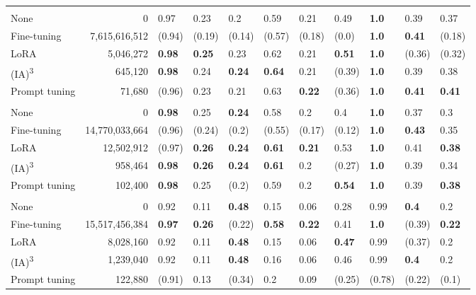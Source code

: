 \documentclass[12pt]{book}
\begin{document}
\begin{ThreePartTable}
\begin{xltabular}{\textwidth}{lr!{\color{white}\hspace{.5em}}YYYYYY!{\color{white}\hspace{1em}}YYY}
         \bigstrut \\*
        None & 0 & 0.97 & 0.23 & 0.2 & 0.59 & 0.21 & 0.49 & \textbf{1.0} & 0.39 & 0.37 \\*
        Fine-tuning & 7,615,616,512 & (0.94) & (0.19) & (0.14) & (0.57) & (0.18) & (0.0) & \textbf{1.0} & \textbf{0.41} & (0.18) \\*
        LoRA & 5,046,272 & \textbf{0.98} & \textbf{0.25} & 0.23 & 0.62 & 0.21 & \textbf{0.51} & \textbf{1.0} & (0.36) & (0.32) \\*
        (IA)\textsuperscript{3} & 645,120 & \textbf{0.98} & 0.24 & \textbf{0.24} & \textbf{0.64} & 0.21 & (0.39) & \textbf{1.0} & 0.39 & 0.38 \\*
        Prompt tuning & 71,680 & (0.96) & 0.23 & 0.21 & 0.63 & \textbf{0.22} & (0.36) & \textbf{1.0} & \textbf{0.41} & \textbf{0.41} \\

         \bigstrut \\*
        None & 0 & \textbf{0.98} & 0.25 & \textbf{0.24} & 0.58 & 0.2 & 0.4 & \textbf{1.0} & 0.37 & 0.3 \\*
        Fine-tuning & 14,770,033,664 & (0.96) & (0.24) & (0.2) & (0.55) & (0.17) & (0.12) & \textbf{1.0} & \textbf{0.43} & 0.35 \\*
        LoRA & 12,502,912 & (0.97) & \textbf{0.26} & \textbf{0.24} & \textbf{0.61} & \textbf{0.21} & 0.53 & \textbf{1.0} & 0.41 & \textbf{0.38} \\*
        (IA)\textsuperscript{3} & 958,464 & \textbf{0.98} & \textbf{0.26} & \textbf{0.24} & \textbf{0.61} & 0.2 & (0.27) & \textbf{1.0} & 0.39 & 0.34 \\*
        Prompt tuning & 102,400 & \textbf{0.98} & 0.25 & (0.2) & 0.59 & 0.2 & \textbf{0.54} & \textbf{1.0} & 0.39 & \textbf{0.38} \\

         \bigstrut \\*
        None & 0 & 0.92 & 0.11 & \textbf{0.48} & 0.15 & 0.06 & 0.28 & 0.99 & \textbf{0.4} & 0.2 \\*
        Fine-tuning & 15,517,456,384 & \textbf{0.97} & \textbf{0.26} & (0.22) & \textbf{0.58} & \textbf{0.22} & 0.41 & \textbf{1.0} & (0.39) & \textbf{0.22} \\*
        LoRA & 8,028,160 & 0.92 & 0.11 & \textbf{0.48} & 0.15 & 0.06 & \textbf{0.47} & 0.99 & (0.37) & 0.2 \\*
        (IA)\textsuperscript{3} & 1,239,040 & 0.92 & 0.11 & \textbf{0.48} & 0.16 & 0.06 & 0.46 & 0.99 & \textbf{0.4} & 0.2 \\*
        Prompt tuning & 122,880 & (0.91) & 0.13 & (0.34) & 0.2 & 0.09 & (0.25) & (0.78) & (0.22) & (0.1) \\


\end{xltabular}
\end{ThreePartTable}
\end{document}
